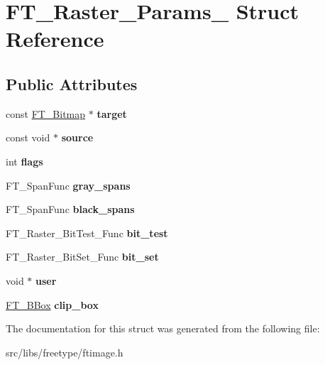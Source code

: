 \hypertarget{struct_f_t___raster___params__}{
\section{FT\_\-Raster\_\-Params\_\- Struct Reference}
\label{struct_f_t___raster___params__}
}
\subsection*{Public Attributes}
\begin{DoxyCompactItemize}
\item 
\hypertarget{struct_f_t___raster___params___a2ba8941740db23ec91302aa9bd154da3}{
const \hyperlink{struct_f_t___bitmap__}{FT\_\-Bitmap} $\ast$ {\bfseries target}}
\label{struct_f_t___raster___params___a2ba8941740db23ec91302aa9bd154da3}

\item 
\hypertarget{struct_f_t___raster___params___a9be95865384791b018f7a9665a062ee5}{
const void $\ast$ {\bfseries source}}
\label{struct_f_t___raster___params___a9be95865384791b018f7a9665a062ee5}

\item 
\hypertarget{struct_f_t___raster___params___a1a28ab69b8296b4378886d1a2b57d333}{
int {\bfseries flags}}
\label{struct_f_t___raster___params___a1a28ab69b8296b4378886d1a2b57d333}

\item 
\hypertarget{struct_f_t___raster___params___a456191f1944775933e3d9d36c8632c35}{
FT\_\-SpanFunc {\bfseries gray\_\-spans}}
\label{struct_f_t___raster___params___a456191f1944775933e3d9d36c8632c35}

\item 
\hypertarget{struct_f_t___raster___params___a42c30e60ad5e243cf78833232e052b47}{
FT\_\-SpanFunc {\bfseries black\_\-spans}}
\label{struct_f_t___raster___params___a42c30e60ad5e243cf78833232e052b47}

\item 
\hypertarget{struct_f_t___raster___params___aff3c1a2a7eda24136a46715128d24ed6}{
FT\_\-Raster\_\-BitTest\_\-Func {\bfseries bit\_\-test}}
\label{struct_f_t___raster___params___aff3c1a2a7eda24136a46715128d24ed6}

\item 
\hypertarget{struct_f_t___raster___params___ac66c3c44fcb63c254a46170d85d653c0}{
FT\_\-Raster\_\-BitSet\_\-Func {\bfseries bit\_\-set}}
\label{struct_f_t___raster___params___ac66c3c44fcb63c254a46170d85d653c0}

\item 
\hypertarget{struct_f_t___raster___params___af78bac59f93c989840bbcbcbefd77c55}{
void $\ast$ {\bfseries user}}
\label{struct_f_t___raster___params___af78bac59f93c989840bbcbcbefd77c55}

\item 
\hypertarget{struct_f_t___raster___params___ab32f75f19d9cacb20e410886c055e306}{
\hyperlink{struct_f_t___b_box__}{FT\_\-BBox} {\bfseries clip\_\-box}}
\label{struct_f_t___raster___params___ab32f75f19d9cacb20e410886c055e306}

\end{DoxyCompactItemize}


The documentation for this struct was generated from the following file:\begin{DoxyCompactItemize}
\item 
src/libs/freetype/ftimage.h\end{DoxyCompactItemize}
